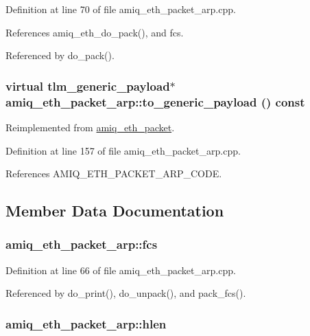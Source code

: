 Definition at line 70 of file amiq\_\-eth\_\-packet\_\-arp.cpp.

References amiq\_\-eth\_\-do\_\-pack(), and fcs.

Referenced by do\_\-pack().\hypertarget{classamiq__eth__packet__arp_a24f433f25d4cec2799e58a836c1411f0}{
\subsubsection[{to\_\-generic\_\-payload}]{\setlength{\rightskip}{0pt plus 5cm}virtual tlm\_\-generic\_\-payload$\ast$ amiq\_\-eth\_\-packet\_\-arp::to\_\-generic\_\-payload () const}}
\label{classamiq__eth__packet__arp_a24f433f25d4cec2799e58a836c1411f0}


Reimplemented from \hyperlink{classamiq__eth__packet_a6dd92751d8172eeaa347d71bb415b0d5}{amiq\_\-eth\_\-packet}.

Definition at line 157 of file amiq\_\-eth\_\-packet\_\-arp.cpp.

References AMIQ\_\-ETH\_\-PACKET\_\-ARP\_\-CODE.

\subsection{Member Data Documentation}
\hypertarget{classamiq__eth__packet__arp_ac30a0aba3c6f9178fba78dcc1dd6327e}{
\subsubsection[{fcs}]{ {\bf amiq\_\-eth\_\-packet\_\-arp::fcs}}}
\label{classamiq__eth__packet__arp_ac30a0aba3c6f9178fba78dcc1dd6327e}


Definition at line 66 of file amiq\_\-eth\_\-packet\_\-arp.cpp.

Referenced by do\_\-print(), do\_\-unpack(), and pack\_\-fcs().\hypertarget{classamiq__eth__packet__arp_ad86a177f701e6128715273f80c531254}{
\subsubsection[{hlen}]{ {\bf amiq\_\-eth\_\-packet\_\-arp::hlen}}}
\label{classamiq__eth__packet__arp_ad86a177f701e6128715273f80c531254}


